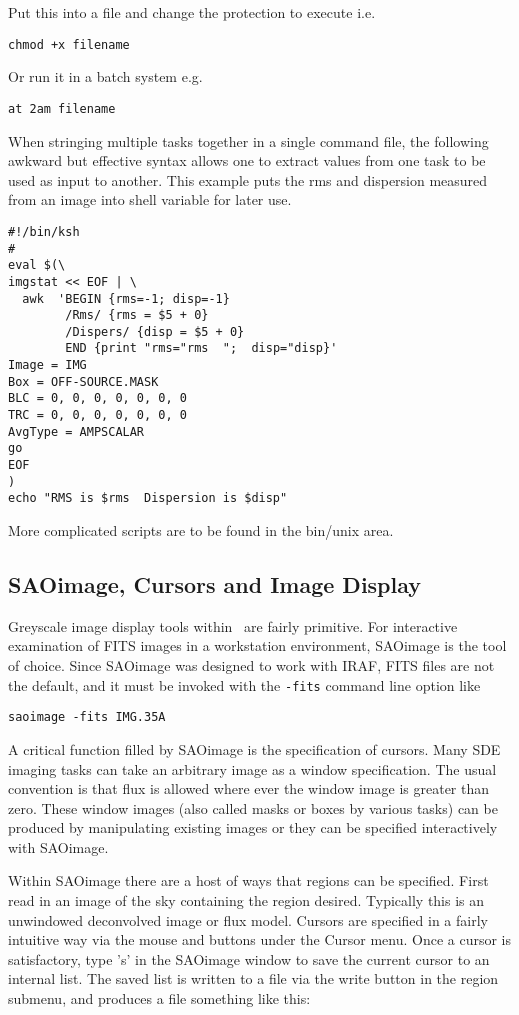 Put this into a file and change the protection to execute i.e.

{\tt chmod +x filename}

Or run it in a batch system e.g.

{\tt at 2am filename}

When stringing multiple tasks together in a single command file, the
following awkward but effective syntax allows one to extract values from
one task to be used as input to another.  This example puts the rms
and dispersion measured from an image into shell variable for later use.

\begin{verbatim}
#!/bin/ksh 
#
eval $(\
imgstat << EOF | \
  awk  'BEGIN {rms=-1; disp=-1}
        /Rms/ {rms = $5 + 0}
        /Dispers/ {disp = $5 + 0}
        END {print "rms="rms  ";  disp="disp}'
Image = IMG
Box = OFF-SOURCE.MASK
BLC = 0, 0, 0, 0, 0, 0, 0
TRC = 0, 0, 0, 0, 0, 0, 0
AvgType = AMPSCALAR
go
EOF
)
echo "RMS is $rms  Dispersion is $disp"
\end{verbatim}

\noindent
More complicated scripts are to be found in the bin/unix area.

\subsection{SAOimage, Cursors and Image Display}

Greyscale image display tools within \sde\ are fairly primitive.  For
interactive examination of FITS images in a workstation environment,
SAOimage is the tool of choice.  Since SAOimage was designed to work
with IRAF, FITS files are not the default, and it must be invoked with
the {\tt -fits} command line option like

{\tt saoimage -fits IMG.35A}

A critical function filled by SAOimage is the specification of cursors.
Many SDE imaging tasks can take an arbitrary image as a window
specification.  The usual convention is that flux is allowed where ever the
window image is greater than zero.  These window images (also called masks
or boxes by various tasks) can be produced by manipulating existing images
or they can be specified interactively with SAOimage.

Within SAOimage there are a host of ways that regions can be specified.
First read in an image of the sky containing the region desired.  Typically
this is an unwindowed deconvolved image or flux model.  Cursors are
specified in a fairly intuitive way via the mouse and buttons under the
{\sf Cursor} menu.  Once a cursor is satisfactory, type 's' in the SAOimage
window to save the current cursor to an internal list.  The saved list is
written to a file via the {\sf write} button in the {\sf region} submenu,
and produces a file something like this:

